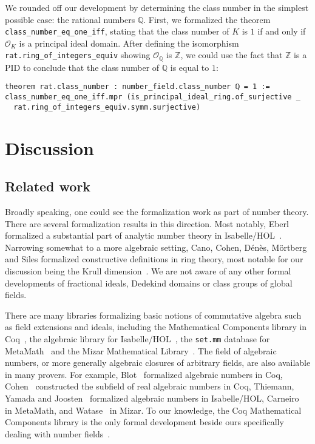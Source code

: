 \documentclass[a4paper,USenglish,cleveref, autoref, thm-restate]{lipics-v2021}
\newcommand{\lean}[1]{\texttt{#1}\xspace}
\newcommand*{\OK}[1][K]{\mathcal{O}_{#1}}
\newcommand{\Q}{\mathbb{Q}}
\newcommand{\Z}{\mathbb{Z}}
\begin{document}
We rounded off our development by determining the class number in the simplest possible case: the rational numbers $\Q$.
First, we formalized the theorem \lean{class\_number\_eq\_one\_iff}, stating that the class number of $K$ is $1$ if and only if $\OK$ is a principal ideal domain.
After defining the isomorphism \lean{rat.ring\_of\_integers\_equiv} showing $\OK[\Q]$ is $\Z$,
we could use the fact that $\Z$ is a PID to conclude that the class number of $\Q$ is equal to $1$:
\begin{lstlisting}
theorem rat.class_number : number_field.class_number ℚ = 1 :=
class_number_eq_one_iff.mpr (is_principal_ideal_ring.of_surjective _
  rat.ring_of_integers_equiv.symm.surjective)
\end{lstlisting}

\section{Discussion}

\subsection{Related work}

Broadly speaking, one could see the formalization work as part of number theory. There are several formalization results in this direction.
Most notably, Eberl formalized a substantial part of analytic number theory in Isabelle/HOL~\cite{Eberl19}.
Narrowing somewhat to a more algebraic setting,
Cano, Cohen, Dénès, Mörtberg and Siles formalized constructive definitions in ring theory, most notable for our discussion being the Krull dimension~\cite{linear-algebra-coq}.
We are not aware of any other formal developments of fractional ideals, Dedekind domains or class groups of global fields.

There are many libraries formalizing basic notions of commutative algebra such as field extensions and ideals, including the Mathematical Components library in Coq~\cite{mathcomp},
the algebraic library for Isabelle/HOL~\cite{algebra_isabelle},
the \texttt{set.mm} database for MetaMath~\cite{metamath} and the Mizar Mathematical Library~\cite{algebraic-hierarchy_mizar}.
The field of algebraic numbers, or more generally algebraic closures of arbitrary fields, are also available in many provers.
For example, Blot~\cite{algebraic-numbers-ccorn} formalized algebraic numbers in Coq,
Cohen~\cite{real-algebraic-numbers-coq} constructed the subfield of real algebraic numbers in Coq,
Thiemann, Yamada and Joosten~\cite{algebraic-numbers-isabelle} formalized algebraic numbers in Isabelle/HOL,
Carneiro~\cite{algebraic-numbers-metamath} in MetaMath,
and Watase~\cite{algebraic-numbers-mizar} in Mizar.
To our knowledge, the Coq Mathematical Components library is the only formal development beside ours specifically dealing with number fields~\cite[\texttt{field/algnum.v}]{mathcomp}.
\end{document}
